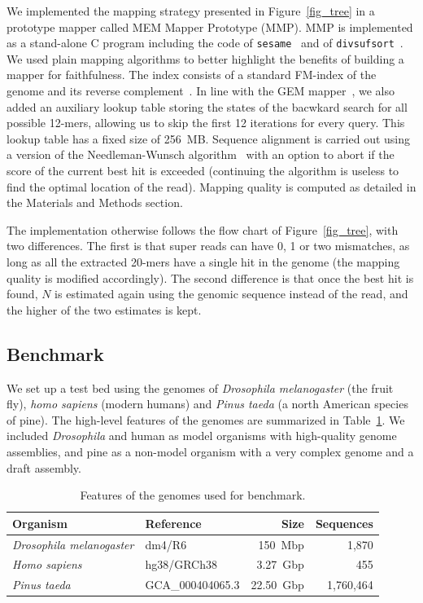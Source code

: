 \documentclass[english]{article}
\begin{document}
We implemented the mapping strategy presented in Figure~\ref{fig_tree} in
a prototype mapper called MEM Mapper Prototype (MMP). MMP is implemented
as a stand-alone C program including the code of
\texttt{sesame}~\cite{Filion619155} and of
\texttt{divsufsort}~\cite{fischer2017dismantling}. We used plain
mapping algorithms to better highlight the benefits of building a mapper
for faithfulness. The index consists of a standard FM-index of the genome
and its reverse complement~\citep[the implementation is detailed in
ref.][]{blog}. In line with the GEM mapper~\cite{pmid23103880}, we also
added an auxiliary lookup table storing the states of the bacwkard search
for all possible 12-mers, allowing us to skip the first 12 iterations for
every query. This lookup table has a fixed size of 256~MB. Sequence
alignment is carried out using a version of the Needleman-Wunsch
algorithm~\cite{pmid5420325} with an option to abort if the score of the
current best hit is exceeded (continuing the algorithm is useless to find
the optimal location of the read). Mapping quality is computed as detailed
in the Materials and Methods section.

The implementation otherwise follows the flow chart of
Figure~\ref{fig_tree}, with two differences. The first is that super reads
can have 0, 1 or two mismatches, as long as all the extracted 20-mers have
a single hit in the genome (the mapping quality is modified accordingly).
The second difference is that once the best hit is found, $N$ is estimated
again using the genomic sequence instead of the read, and the higher of
the two estimates is kept.

\subsection{Benchmark}

We set up a test bed using the genomes of \textit{Drosophila melanogaster}
(the fruit fly), \textit{homo sapiens} (modern humans) and \textit{Pinus
taeda} (a north American species of pine). The high-level features of the
genomes are summarized in Table~\ref{table_genomes}. We included
\textit{Drosophila} and human as model organisms with high-quality genome
assemblies, and pine as a non-model organism with a very complex genome
and a draft assembly.

\begin{table}[b]
\centering
\caption{Features of the genomes used for benchmark.}
\label{table_genomes}%
\begin{tabular}{@{}llrr}
Organism & Reference & Size & Sequences \\
\hline
\textit{Drosophila melanogaster} & dm4/R6 & 150~Mbp & 1,870 \\
\textit{Homo sapiens} & hg38/GRCh38 & 3.27~Gbp & 455 \\
\textit{Pinus taeda} & GCA\_000404065.3 & 22.50~Gbp & 1,760,464 \\
\end{tabular}
\end{table}
\end{document}
